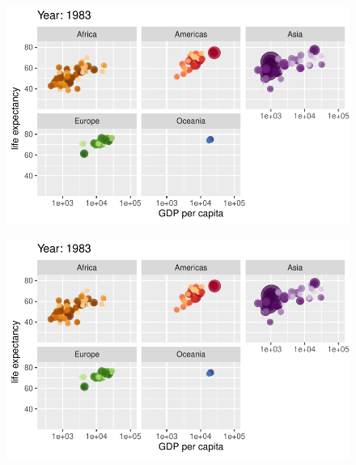 \documentclass[
  letterpaper,
  DIV=11,
  numbers=noendperiod]{scrartcl}
\begin{document}
\begin{figure}[H]

{\centering \includegraphics{class05_files/figure-pdf/unnamed-chunk-24-56.pdf}

}

\end{figure}

\begin{figure}[H]

{\centering \includegraphics{class05_files/figure-pdf/unnamed-chunk-24-57.pdf}

}

\end{figure}
\end{document}
